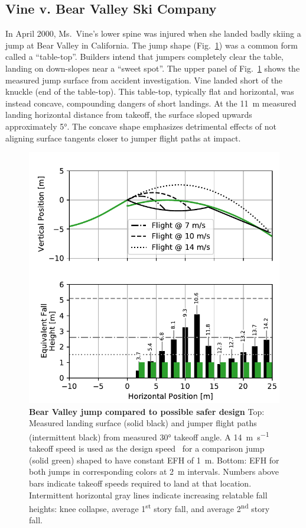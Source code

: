 \documentclass[smallextended]{svjour3}       %
\begin{document}
\subsection{Vine v. Bear Valley Ski Company}
\label{sec:vine}
%
In April 2000, Ms.~Vine's lower spine was injured when she landed badly skiing
a jump at Bear Valley in California. The jump shape
(Fig.~\ref{fig:vine-v-bear-valley}) was a common form called a ``table-top''.
Builders intend that jumpers completely clear the table, landing on down-slopes
near a ``sweet spot''.  The upper panel of Fig.~\ref{fig:vine-v-bear-valley}
shows the  measured jump surface from accident investigation. Vine landed short
of the knuckle (end of the table-top). This table-top, typically flat and
horizontal, was instead concave, compounding dangers of short landings. At the
11~\si{\meter} measured landing horizontal distance from  takeoff, the surface
sloped upwards approximately 5\si{\degree}. The concave shape emphasizes
detrimental effects of not aligning surface tangents closer to jumper flight
paths at impact.
%
\begin{figure}
  \centering
  \includegraphics[width=\columnwidth]{figures/vine-v-bear-valley.pdf}
  \caption{\textbf{Bear Valley jump compared to possible safer design}
  Top: Measured landing surface (solid black) and jumper flight paths
  (intermittent black) from measured 30\si{\degree} takeoff angle.  A
  14~\si{\meter\per\second} takeoff speed is used as the design
  speed~\cite{Levy2015} for a comparison jump (solid green) shaped to have
  constant EFH of 1~\si{\meter}.
  Bottom: EFH for both jumps in corresponding colors at 2~\si{\meter}
  intervals. Numbers above bars indicate takeoff speeds required to land at
  that location.
  Intermittent horizontal gray lines indicate increasing relatable fall
  heights: knee collapse, average 1\textsuperscript{st} story fall, and average
  2\textsuperscript{nd} story fall.
  }
  \label{fig:vine-v-bear-valley}
\end{figure}
\end{document}
